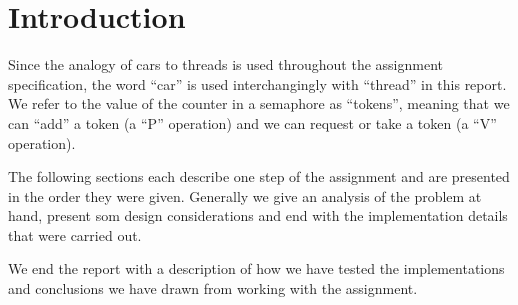 \section{Introduction}

Since the analogy of cars to threads is used throughout the assignment specification, the word ``car'' is used interchangingly with ``thread'' in this report. We refer to the value of the counter in a semaphore as ``tokens'', meaning that we can ``add'' a token (a ``P'' operation) and we can request or take a token (a ``V'' operation).

The following sections each describe one step of the assignment and are presented in the order they were given. Generally we give an analysis of the problem at hand, present som design considerations and end with the implementation details that were carried out.

We end the report with a description of how we have tested the implementations and conclusions we have drawn from working with the assignment.

